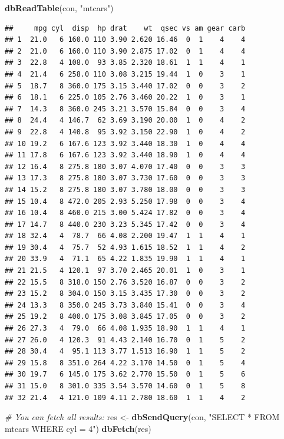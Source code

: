 \documentclass[]{book}
\newenvironment{Shaded}{\begin{snugshade}}{\end{snugshade}}
\newcommand{\CommentTok}[1]{\textcolor[rgb]{0.56,0.35,0.01}{\textit{#1}}}
\newcommand{\KeywordTok}[1]{\textcolor[rgb]{0.13,0.29,0.53}{\textbf{#1}}}
\newcommand{\NormalTok}[1]{#1}
\newcommand{\StringTok}[1]{\textcolor[rgb]{0.31,0.60,0.02}{#1}}
\begin{document}
\begin{Shaded}
\begin{Highlighting}[]
\KeywordTok{dbReadTable}\NormalTok{(con, }\StringTok{"mtcars"}\NormalTok{)}
\end{Highlighting}
\end{Shaded}

\begin{verbatim}
##     mpg cyl  disp  hp drat    wt  qsec vs am gear carb
## 1  21.0   6 160.0 110 3.90 2.620 16.46  0  1    4    4
## 2  21.0   6 160.0 110 3.90 2.875 17.02  0  1    4    4
## 3  22.8   4 108.0  93 3.85 2.320 18.61  1  1    4    1
## 4  21.4   6 258.0 110 3.08 3.215 19.44  1  0    3    1
## 5  18.7   8 360.0 175 3.15 3.440 17.02  0  0    3    2
## 6  18.1   6 225.0 105 2.76 3.460 20.22  1  0    3    1
## 7  14.3   8 360.0 245 3.21 3.570 15.84  0  0    3    4
## 8  24.4   4 146.7  62 3.69 3.190 20.00  1  0    4    2
## 9  22.8   4 140.8  95 3.92 3.150 22.90  1  0    4    2
## 10 19.2   6 167.6 123 3.92 3.440 18.30  1  0    4    4
## 11 17.8   6 167.6 123 3.92 3.440 18.90  1  0    4    4
## 12 16.4   8 275.8 180 3.07 4.070 17.40  0  0    3    3
## 13 17.3   8 275.8 180 3.07 3.730 17.60  0  0    3    3
## 14 15.2   8 275.8 180 3.07 3.780 18.00  0  0    3    3
## 15 10.4   8 472.0 205 2.93 5.250 17.98  0  0    3    4
## 16 10.4   8 460.0 215 3.00 5.424 17.82  0  0    3    4
## 17 14.7   8 440.0 230 3.23 5.345 17.42  0  0    3    4
## 18 32.4   4  78.7  66 4.08 2.200 19.47  1  1    4    1
## 19 30.4   4  75.7  52 4.93 1.615 18.52  1  1    4    2
## 20 33.9   4  71.1  65 4.22 1.835 19.90  1  1    4    1
## 21 21.5   4 120.1  97 3.70 2.465 20.01  1  0    3    1
## 22 15.5   8 318.0 150 2.76 3.520 16.87  0  0    3    2
## 23 15.2   8 304.0 150 3.15 3.435 17.30  0  0    3    2
## 24 13.3   8 350.0 245 3.73 3.840 15.41  0  0    3    4
## 25 19.2   8 400.0 175 3.08 3.845 17.05  0  0    3    2
## 26 27.3   4  79.0  66 4.08 1.935 18.90  1  1    4    1
## 27 26.0   4 120.3  91 4.43 2.140 16.70  0  1    5    2
## 28 30.4   4  95.1 113 3.77 1.513 16.90  1  1    5    2
## 29 15.8   8 351.0 264 4.22 3.170 14.50  0  1    5    4
## 30 19.7   6 145.0 175 3.62 2.770 15.50  0  1    5    6
## 31 15.0   8 301.0 335 3.54 3.570 14.60  0  1    5    8
## 32 21.4   4 121.0 109 4.11 2.780 18.60  1  1    4    2
\end{verbatim}

\begin{Shaded}
\begin{Highlighting}[]
\CommentTok{# You can fetch all results:}
\NormalTok{res <-}\StringTok{ }\KeywordTok{dbSendQuery}\NormalTok{(con, }\StringTok{"SELECT * FROM mtcars WHERE cyl = 4"}\NormalTok{)}
\KeywordTok{dbFetch}\NormalTok{(res)}
\end{Highlighting}
\end{Shaded}
\end{document}
